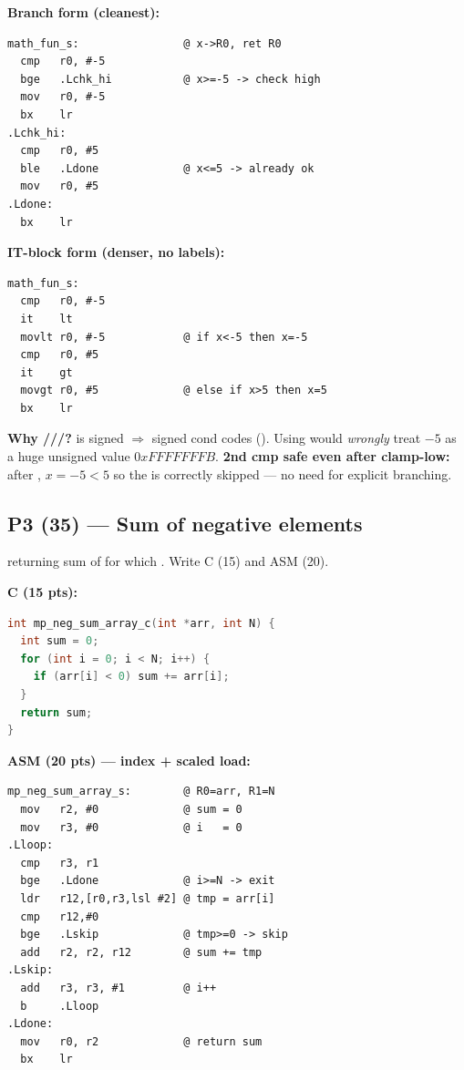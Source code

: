 \textbf{Branch form (cleanest):}
\begin{lstlisting}
math_fun_s:                @ x->R0, ret R0
  cmp   r0, #-5
  bge   .Lchk_hi           @ x>=-5 -> check high
  mov   r0, #-5
  bx    lr
.Lchk_hi:
  cmp   r0, #5
  ble   .Ldone             @ x<=5 -> already ok
  mov   r0, #5
.Ldone:
  bx    lr
\end{lstlisting}

\textbf{IT-block form (denser, no labels):}
\begin{lstlisting}
math_fun_s:
  cmp   r0, #-5
  it    lt
  movlt r0, #-5            @ if x<-5 then x=-5
  cmp   r0, #5
  it    gt
  movgt r0, #5             @ else if x>5 then x=5
  bx    lr
\end{lstlisting}
\textbf{Why ///?}  is signed
$\Rightarrow$ signed cond codes (). Using
 would \emph{wrongly} treat $-5$ as a huge unsigned value
$0xFFFFFFFB$.\;
\textbf{2nd cmp safe even after clamp-low:} after ,
$x=-5<5$ so the  is correctly skipped --- no need for
explicit  branching.

\subsection{P3 (35) --- Sum of negative elements}
\begin{qp}
 returning sum of
 for which . Write C (15) and ASM (20).
\end{qp}

\textbf{C (15 pts):}
\begin{lstlisting}[language=C]
int mp_neg_sum_array_c(int *arr, int N) {
  int sum = 0;
  for (int i = 0; i < N; i++) {
    if (arr[i] < 0) sum += arr[i];
  }
  return sum;
}
\end{lstlisting}

\textbf{ASM (20 pts) --- index + scaled load:}
\begin{lstlisting}
mp_neg_sum_array_s:        @ R0=arr, R1=N
  mov   r2, #0             @ sum = 0
  mov   r3, #0             @ i   = 0
.Lloop:
  cmp   r3, r1
  bge   .Ldone             @ i>=N -> exit
  ldr   r12,[r0,r3,lsl #2] @ tmp = arr[i]
  cmp   r12,#0
  bge   .Lskip             @ tmp>=0 -> skip
  add   r2, r2, r12        @ sum += tmp
.Lskip:
  add   r3, r3, #1         @ i++
  b     .Lloop
.Ldone:
  mov   r0, r2             @ return sum
  bx    lr
\end{lstlisting}

